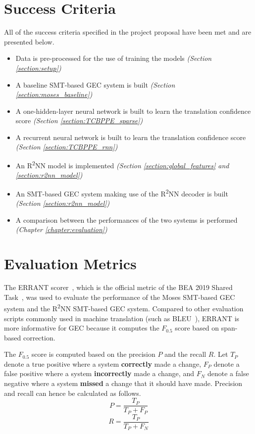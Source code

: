 \documentclass[12pt,a4paper,twoside]{report}
\begin{document}
\section{Success Criteria}\label{section:success_criteria}
All of the success criteria specified in the project proposal have been met and are presented below.
\begin{itemize}
    \item[\checkmark] Data is pre-processed for the use of training the models \textit{(Section \ref{section:setup})}
    \item[\checkmark] A baseline SMT-based GEC system is built \textit{(Section \ref{section:moses_baseline})}
    \item[\checkmark] A one-hidden-layer neural network is built to learn the translation confidence score \textit{(Section \ref{section:TCBPPE_sparse})}
    \item[\checkmark] A recurrent neural network is built to learn the translation confidence score \textit{(Section \ref{section:TCBPPE_rnn})}
    \item[\checkmark] An R\textsuperscript{2}NN model is implemented \textit{(Section \ref{section:global_features} and \ref{section:r2nn_model})}
    \item[\checkmark] An SMT-based GEC system making use of the R\textsuperscript{2}NN decoder is built \textit{(Section \ref{section:r2nn_model})}
    \item[\checkmark] A comparison between the performances of the two systems is performed \textit{(Chapter \ref{chapter:evaluation})}
\end{itemize}

\section{Evaluation Metrics}
The ERRANT scorer~\cite{bryant-etal-2017-automatic, felice-etal-2016-automatic}, which is the official metric of the BEA 2019 Shared Task~\cite{bryant-etal-2019-bea}, was used to evaluate the performance of the Moses SMT-based GEC system and the R\textsuperscript{2}NN SMT-based GEC system. Compared to other evaluation scripts commonly used in machine translation (such as BLEU~\cite{10.3115/1073083.1073135}), ERRANT is more informative for GEC because it computes the $F_{0.5}$ score based on span-based correction.

The $F_{0.5}$ score is computed based on the precision $P$ and the recall $R$. Let $T_P$ denote a true positive where a system \textbf{correctly} made a change, $F_P$ denote a false positive where a system \textbf{incorrectly} made a change, and $F_N$ denote a false negative where a system \textbf{missed} a change that it should have made. Precision and recall can hence be calculated as follows.
\[P = \frac{T_P}{T_P+F_P}\]
\[R = \frac{T_P}{T_P+F_N}\]
\end{document}
